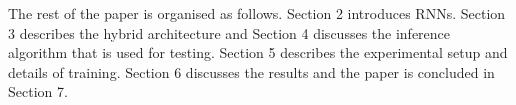 \documentclass{article}
\begin{document}
The rest of the paper is organised as follows. Section 2 introduces RNNs. Section 3 describes the hybrid architecture and Section 4 discusses the inference algorithm that is used for testing. Section 5 describes the experimental setup and details of training. Section 6 discusses the results and the paper is concluded in Section 7. 




 
\end{document}
